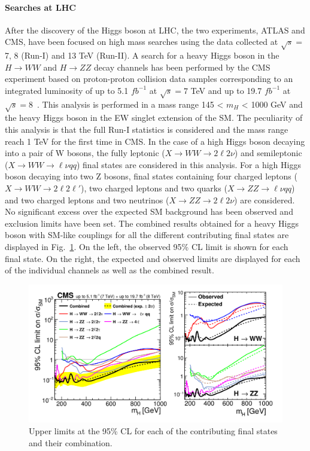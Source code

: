 \paragraph{Searches at LHC} After the discovery of the Higgs boson at LHC, the two experiments, ATLAS and CMS, have been focused on high mass searches using the data collected at $\sqrt{s}=$7, 8 (Run-I) and 13 TeV (Run-II). A search for a heavy Higgs boson in the $H \to WW$ and $H \to ZZ$ decay channels has been performed by the
CMS experiment based on  proton-proton collision data samples corresponding to an integrated luminosity of up to 5.1 $fb^{-1}$ at $\sqrt{s}=7$ TeV and up to 19.7  $fb^{-1}$ at $\sqrt{s}=8$~\cite{Khachatryan:2015cwa}. This analysis is performed in a mass range 145 < $m_H$ < 1000 GeV and the heavy Higgs boson in the EW singlet extension of the SM. The peculiarity of this analysis is that the full Run-I statistics is considered and the mass range reach 1 TeV for the first time in CMS.
In the case of a high Higgs boson decaying into a pair of W bosons, the fully leptonic ($X \to WW \to 2\ell 2\nu$) and semileptonic ($X \to WW \to \ell \nu qq$) final
states are considered in this  analysis. For a high Higgs boson decaying into two Z bosons, final
states containing four charged leptons  ($X \to WW \to 2\ell 2\ell'$), two charged leptons and two quarks ($X \to ZZ \to \ell \nu qq$) and two charged leptons and two neutrinos ($X \to ZZ \to 2\ell 2\nu$) are considered. No significant excess over the expected
SM background has been observed and exclusion limits have been set. The combined results obtained for a heavy Higgs boson with SM-like couplings for all
the different contributing final states are displayed in Fig.~\ref{plots_combination_combinedSM_def}. On the left, the observed
95\% CL limit is shown for each final state. On the right, the expected and observed limits are
displayed for each of the individual channels as well as the combined result.
\begin{figure}
\centering
\includegraphics[scale= 0.9]{../Cap1/plots_combination_combinedSM_def}
\caption{Upper limits at the 95\% CL for each of the contributing final states and their combination. }
\label{plots_combination_combinedSM_def}
\end{figure}
